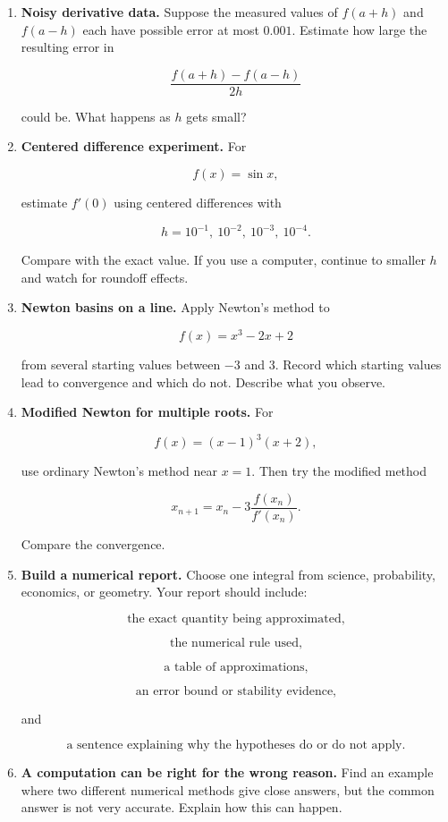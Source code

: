 \begin{enumerate}
\[
\int_0^1 e^{-x^2}\,dx.
\]

Double \(n\) until two successive approximations differ by less than \(10^{-8}\).
Report the final approximation and the value of \(n\).  Explain why the difference
between successive approximations is evidence, not a guaranteed error bound by
itself.

\item \textbf{Noisy derivative data.}
Suppose the measured values of \(f(a+h)\) and \(f(a-h)\) each have possible error at
most \(0.001\).  Estimate how large the resulting error in

\[
\frac{f(a+h)-f(a-h)}{2h}
\]

could be.  What happens as \(h\) gets small?

\item \textbf{Centered difference experiment.}
For

\[
f(x)=\sin x,
\]

estimate \(f'(0)\) using centered differences with

\[
h=10^{-1},\ 10^{-2},\ 10^{-3},\ 10^{-4}.
\]

Compare with the exact value.  If you use a computer, continue to smaller \(h\) and
watch for roundoff effects.

\item \textbf{Newton basins on a line.}
Apply Newton's method to

\[
f(x)=x^3-2x+2
\]

from several starting values between \(-3\) and \(3\).  Record which starting values
lead to convergence and which do not.  Describe what you observe.

\item \textbf{Modified Newton for multiple roots.}
For

\[
f(x)=(x-1)^3(x+2),
\]

use ordinary Newton's method near \(x=1\).  Then try the modified method

\[
x_{n+1}=x_n-3\frac{f(x_n)}{f'(x_n)}.
\]

Compare the convergence.

\item \textbf{Build a numerical report.}
Choose one integral from science, probability, economics, or geometry.  Your report
should include:

\[
\text{the exact quantity being approximated,}
\]

\[
\text{the numerical rule used,}
\]

\[
\text{a table of approximations,}
\]

\[
\text{an error bound or stability evidence,}
\]

and

\[
\text{a sentence explaining why the hypotheses do or do not apply.}
\]

\item \textbf{A computation can be right for the wrong reason.}
Find an example where two different numerical methods give close answers, but the
common answer is not very accurate.  Explain how this can happen.
\end{enumerate}

